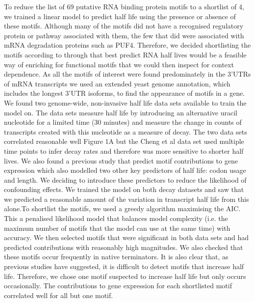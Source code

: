\documentclass{SBCbookchapter}
\begin{document}
To reduce the list of 69 putative RNA binding protein motifs to a shortlist of 4, we trained a linear model to predict half life using the presence or absence of these motifs. Although many of the motifs did not have a recognised regulatory protein or pathway associated with them, the few that did were associated with mRNA degradation proteins such as PUF4. Therefore, we decided shortlisting the motifs according to through that best predict RNA half lives would be a feasible way of enriching for functional motifs that we could then inspect for context dependence. As all the motifs of interest were found predominately in the 3'UTRs of mRNA transcripts we used an extended yeast genome annotation, which includes the longest 3'UTR isoforms, to find the appearance of motifs in a gene. We found two genome-wide, non-invasive half life data sets available to train the model on. The data sets measure half life by introducing an alternative uracil nucleotide for a limited time (30 minutes) and measure the change in counts of transcripts created with this nucleotide as a measure of decay. The two data sets correlated reasonable well Figure 1A but the Cheng et al data set used multiple time points to infer decay rates and therefore was more sensitive to shorter half lives. We also found a previous study that predict motif contributions to gene expression which also modelled two other key predictors of half life: codon usage and length. We deciding to introduce these predictors to reduce the likelihood of confounding effects. We trained the model on both decay datasets and saw that we predicted a reasonable amount of the variation in transcript half life from this alone.To shortlist the motifs, we used a greedy algorithm maximising the AIC. This a penalised likelihood model that balances model complexity (i.e. the maximum number of motifs that the model can use at the same time) with accuracy. We then selected motifs that were significant in both data sets and had predicted contributions with reasonably high magnitudes. We also checked that these motifs occur frequently in native terminators. It is also clear that, as previous studies have suggested, it is difficult to detect motifs that increase half life. Therefore, we chose one motif suspected to increase half life but only occurs occasionally. The contributions to gene expression for each shortlisted motif correlated well for all but one motif.
\end{document}
